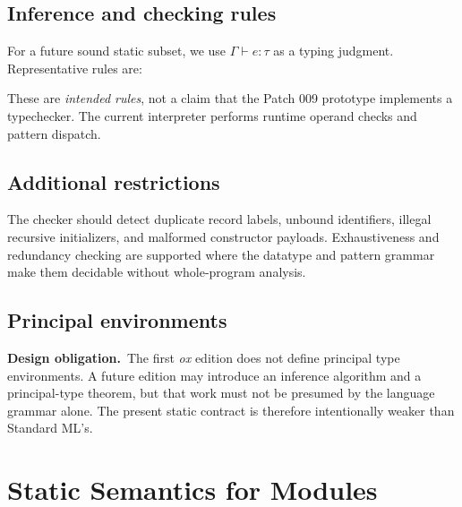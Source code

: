 \documentclass[11pt,oneside,openany]{book}
\newcommand{\ox}{\textit{ox}}
\newcommand{\pending}{\textbf{Design obligation.}\ }
\begin{document}
\section{Inference and checking rules}
For a future sound static subset, we use $\Gamma\vdash e:\tau$ as a typing judgment. Representative rules are:
These are \emph{intended rules}, not a claim that the Patch 009 prototype implements a typechecker. The current interpreter performs runtime operand checks and pattern dispatch.

\section{Additional restrictions}
The checker should detect duplicate record labels, unbound identifiers, illegal recursive initializers, and malformed constructor payloads. Exhaustiveness and redundancy checking are supported where the datatype and pattern grammar make them decidable without whole-program analysis.

\section{Principal environments}
\pending The first \ox{} edition does not define principal type environments. A future edition may introduce an inference algorithm and a principal-type theorem, but that work must not be presumed by the language grammar alone. The present static contract is therefore intentionally weaker than Standard ML's.

\chapter{Static Semantics for Modules}
\end{document}

